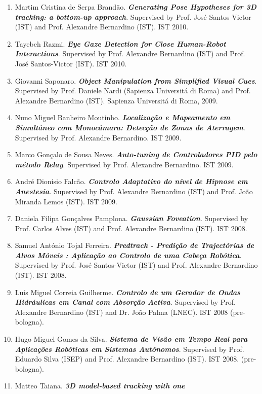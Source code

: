 \begin{enumerate}
  2010.
\item
  Martim Cristina de Serpa Brandão. \emph{\textbf{Generating Pose
  Hypotheses for 3D tracking: a bottom-up approach}}. Supervised by
  Prof. José Santos-Victor (IST) and Prof. Alexandre Bernardino (IST).
  IST 2010.
\item
  Tayebeh Razmi. \emph{\textbf{Eye Gaze Detection for Close Human-Robot
  Interactions}}. Supervised by Prof. Alexandre Bernardino (IST) and
  Prof. José Santos-Victor (IST). IST 2010.
\item
  Giovanni Saponaro. \emph{\textbf{Object Manipulation from Simplified
  Visual Cues}}. Supervised by Prof. Daniele Nardi (Sapienza Universitá
  di Roma) and Prof. Alexandre Bernardino (IST). Sapienza Universitá di
  Roma, 2009.
\item
  Nuno Miguel Banheiro Moutinho. \emph{\textbf{Localização e Mapeamento
  em Simultâneo com Monocâmara: Detecção de Zonas de Aterragem}}.
  Supervised by Prof. Alexandre Bernardino. IST 2009.
\item
  Marco Gonçalo de Sousa Neves. \emph{\textbf{Auto-tuning de
  Controladores PID pelo método Relay}}. Supervised by Prof. Alexandre
  Bernardino. IST 2009.
\item
  André Dionísio Falcão. \emph{\textbf{Controlo Adaptativo do nível de
  Hipnose em Anestesia}}. Supervised by Prof. Alexandre Bernardino (IST)
  and Prof. João Miranda Lemos (IST). IST 2009.
\item
  Daniela Filipa Gonçalves Pamplona. \emph{\textbf{Gaussian Foveation}}.
  Supervised by Prof. Carlos Alves (IST) and Prof. Alexandre Bernardino
  (IST). IST 2008.
\item
  Samuel António Tojal Ferreira. \emph{\textbf{Predtrack - Predição de
  Trajectórias de Alvos Móveis : Aplicação ao Controlo de uma Cabeça
  Robótica}}. Supervised by Prof. José Santos-Victor (IST) and Prof.
  Alexandre Bernardino (IST). IST 2008.
\item
  Luís Miguel Correia Guilherme. \emph{\textbf{Controlo de um Gerador de
  Ondas Hidráulicas em Canal com Absorção Activa}}. Supervised by Prof.
  Alexandre Bernardino (IST) and Dr. João Palma (LNEC). IST 2008
  (pre-bologna).
\item
  Hugo Miguel Gomes da Silva. \emph{\textbf{Sistema de Visão em Tempo
  Real para Aplicações Robóticas em Sistemas Autónomos}}. Supervised by
  Prof. Eduardo Silva (ISEP) and Prof. Alexandre Bernardino (IST). IST
  2008. (pre-bologna).
\item
  Matteo Taiana. \emph{\textbf{3D model-based tracking with one
}}
\end{enumerate}
